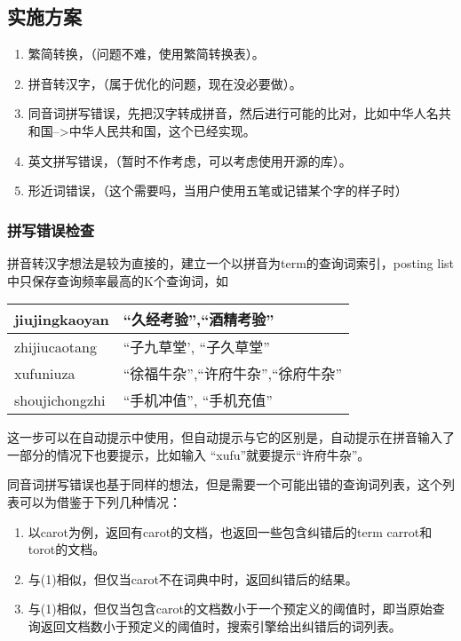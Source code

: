 \subsection{实施方案}
\begin{enumerate}[(1)]
\item 繁简转换，（问题不难，使用繁简转换表）。
\item 拼音转汉字，（属于优化的问题，现在没必要做）。
\item 同音词拼写错误，先把汉字转成拼音，然后进行可能的比对，比如中华人名共和国-->中华人民共和国，这个已经实现。
\item 英文拼写错误，（暂时不作考虑，可以考虑使用开源的库）。
\item 形近词错误，（这个需要吗，当用户使用五笔或记错某个字的样子时）
\end{enumerate}
\subsubsection{拼写错误检查}
\par 拼音转汉字想法是较为直接的，建立一个以拼音为term的查询词索引，posting list中只保存查询频率最高的K个查询词，如
\begin{table}[h]
  \centering
  \begin{tabular}{|l|l|}
\hline
jiujingkaoyan &“久经考验”,“酒精考验”\\ \hline
zhijiucaotang & “子九草堂', “子久草堂” \\ \hline
xufuniuza & “徐福牛杂”,“许府牛杂”,“徐府牛杂”\\ \hline
shoujichongzhi&“手机冲值”, “手机充值”\\ \hline
  \end{tabular}
\end{table}
\par 这一步可以在自动提示中使用，但自动提示与它的区别是，自动提示在拼音输入了一部分的情况下也要提示，比如输入 “xufu”就要提示“许府牛杂”。
\par 同音词拼写错误也基于同样的想法，但是需要一个可能出错的查询词列表，这个列表可以为借鉴于下列几种情况：
\begin{enumerate}[(1)]
\item 以carot为例，返回有carot的文档，也返回一些包含纠错后的term carrot和torot的文档。
\item 与(1)相似，但仅当carot不在词典中时，返回纠错后的结果。
\item 与(1)相似，但仅当包含carot的文档数小于一个预定义的阈值时，即当原始查询返回文档数小于预定义的阈值时，搜索引擎给出纠错后的词列表。
\end{enumerate}
